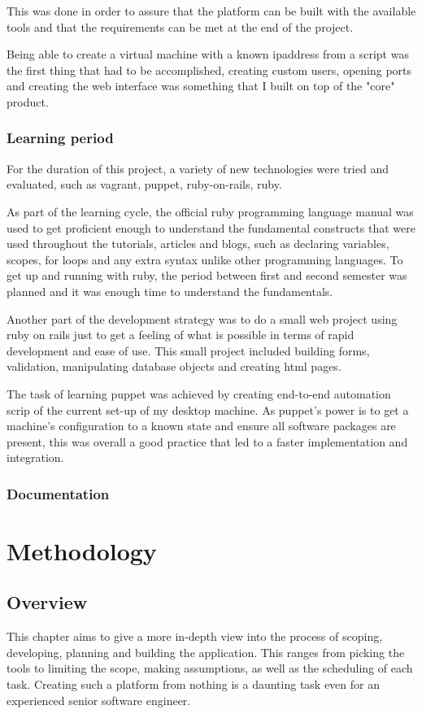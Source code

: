 \documentclass{article}
\begin{document}
This was done in order to assure that the platform can be built with the available tools and that the requirements can be met at the end of the project.

Being able to create a virtual machine with a known \gls{ipaddress} from a script was the first thing that had to be accomplished, creating custom users, opening ports and creating the web interface was something that I built on top of the "core" product.

\subsubsection{Learning period}
For the duration of this project, a variety of new technologies were tried and evaluated, such as \gls{vagrant}, \gls{puppet}, \gls{ruby-on-rails}, \gls{ruby}.

As part of the learning cycle, the official ruby programming language manual was used to get proficient enough to understand the fundamental constructs that were used throughout the tutorials, articles and blogs, such as declaring variables, scopes, for loops and any extra syntax unlike other programming languages. To get up and running with \gls{ruby}, the period between first and second semester was planned and it was enough time to understand the fundamentals.

Another part of the development strategy was to do a small web project using ruby on rails just to get a feeling of what is possible in terms of rapid development and ease of use. This small project included building forms, validation, manipulating database objects and creating \gls{html} pages.

The task of learning \gls{puppet} was achieved by creating end-to-end automation scrip of the current set-up of my desktop machine. As puppet's power is to get a machine's configuration to a known state and ensure all software packages are present, this was overall a good practice that led to a faster implementation and integration.

\subsubsection{Documentation}



\newpage
\section{Methodology}
\subsection{Overview}
This chapter aims to give a more in-depth view into the process of scoping, developing, planning and building the application. This ranges from picking the tools to limiting the scope, making assumptions, as well as the scheduling of each task. Creating such a platform from nothing is a daunting task even for an experienced senior software engineer.
\end{document}
